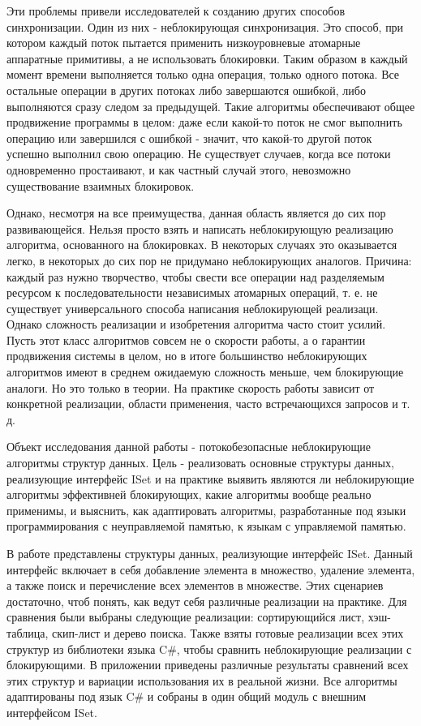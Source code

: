 \documentclass[12pt]{article}
\begin{document}
{			\par Эти проблемы привели исследователей к созданию других способов синхронизации. Один из них - неблокирующая синхронизация. Это способ, при котором каждый поток пытается применить низкоуровневые атомарные аппаратные примитивы, а не использовать блокировки. Таким образом в каждый момент времени выполняется только одна операция, только одного потока. Все остальные операции в других потоках либо завершаются ошибкой, либо выполняются сразу следом за предыдущей. Такие алгоритмы обеспечивают общее продвижение программы в целом: даже если какой-то поток не смог выполнить операцию или завершился с ошибкой - значит, что какой-то другой поток успешно выполнил свою операцию. Не существует случаев, когда все потоки одновременно простаивают, и как частный случай этого, невозможно существование взаимных блокировок. 
			\par Однако, несмотря на все преимущества, данная область является до сих пор развивающейся. Нельзя просто взять и написать неблокирующую реализацию алгоритма, основанного на блокировках. В некоторых случаях это оказывается легко, в некоторых до сих пор не придумано неблокирующих аналогов. Причина: каждый раз нужно творчество, чтобы свести все операции над разделяемым ресурсом к последовательности независимых атомарных операций, т. е. не существует универсального способа написания неблокирующей реализаци. Однако сложность реализации и изобретения алгоритма часто стоит усилий. Пусть этот класс алгоритмов совсем не о скорости работы, а о гарантии продвижения системы в целом, но в итоге большинство неблокирующих алгоритмов имеют в среднем ожидаемую сложность меньше, чем блокирующие аналоги. Но это только в теории. На практике скорость работы зависит от конкретной реализации, области применения, часто встречающихся запросов и т. д.
			\par Объект исследования данной работы - потокобезопасные неблокирующие алгоритмы структур данных. Цель - реализовать основные структуры данных, реализующие интерфейс ISet и на практике выявить являются ли неблокирующие алгоритмы эффективней блокирующих, какие алгоритмы вообще реально применимы, и выяснить, как адаптировать алгоритмы, разработанные под языки программирования с неуправляемой памятью, к языкам с управляемой памятью.
			\par В работе представлены структуры данных, реализующие интерфейс ISet. Данный интерфейс включает в себя добавление элемента в множество, удаление элемента, а также поиск и перечисление всех элементов в множестве. Этих сценариев достаточно, чтоб понять, как ведут себя различные реализации на практике. Для сравнения были выбраны следующие реализации: сортирующийся лист, хэш-таблица, скип-лист и дерево поиска. Также взяты готовые реализации всех этих структур из библиотеки языка C\#, чтобы сравнить неблокирующие реализации с блокирующими. В приложении приведены различные результаты сравнений всех этих структур и вариации использования их в реальной жизни. Все алгоритмы адаптированы под язык C\# и собраны в один общий модуль с внешним интерфейсом ISet.
		
}
\end{document}
